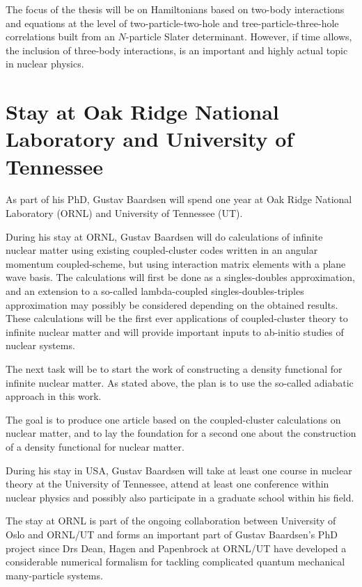 \documentclass[12pt,titlepage]{article}
\begin{document}
The focus of  the thesis will be on Hamiltonians based on  two-body interactions and equations at the level of two-particle-two-hole and tree-particle-three-hole correlations built from an $N$-particle Slater determinant. However, if time allows, the inclusion of three-body interactions, is an important and highly actual topic in nuclear physics. 

\section{Stay at Oak Ridge National Laboratory and University of Tennessee}
As part of his PhD, Gustav Baardsen will spend one year at Oak Ridge National Laboratory (ORNL) and University of Tennessee (UT). 

During his stay at ORNL, Gustav Baardsen will do calculations of infinite nuclear matter using existing coupled-cluster codes written in an angular momentum coupled-scheme, but using interaction matrix elements with a plane wave basis. The calculations will first be done as a singles-doubles approximation, and an extension to a so-called lambda-coupled singles-doubles-triples approximation may possibly be considered depending on the obtained results. These calculations will be the first ever applications of coupled-cluster theory to infinite nuclear matter and will provide important inputs to ab-initio studies of nuclear systems.

The next task will be to start the work of constructing a density
functional for infinite nuclear matter. As stated above, the plan is to use
the so-called adiabatic approach in this work.

The goal is to produce one article based on the coupled-cluster calculations
on nuclear matter, and to lay the foundation for a second one about the
construction of a density functional for nuclear matter.

During his stay in USA, Gustav Baardsen will take at least one course in nuclear theory at the University of Tennessee, attend at least one conference within nuclear physics and possibly also participate in a graduate school within his field. 

The stay at ORNL is part of the ongoing collaboration between University
of Oslo and ORNL/UT and forms an 
important part of Gustav Baardsen's PhD project since Drs Dean, Hagen and
Papenbrock at ORNL/UT have developed
a considerable numerical formalism for tackling complicated quantum
mechanical many-particle systems.
\end{document}
